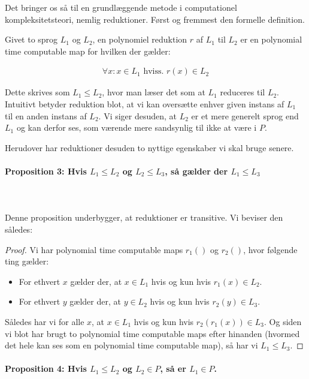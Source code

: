 Det bringer os så til en grundlæggende metode i computationel kompleksitetsteori, nemlig reduktioner. Først og fremmest den formelle definition.

Givet to sprog $L_1$ og $L_2$, en polynomiel reduktion $r$ af $L_1$ til $L_2$ er en polynomial time computable map for hvilken der gælder:

\begin{align*}
 \forall x : x \in L_1 \text{ hviss. } r(x) \in L_2
\end{align*}

Dette skrives som $L_1 \leq L_2$, hvor man læser det som at $L_1$ reduceres til $L_2$. Intuitivt betyder reduktion blot, at vi kan oversætte enhver given instans af $L_1$ til en anden instans af $L_2$. Vi siger desuden, at $L_2$ er et mere generelt sprog end $L_1$ og kan derfor ses, som værende mere sandsynlig til ikke at være i $P$.


Herudover har  reduktioner desuden to nyttige egenskaber vi skal bruge senere.

\paragraph{Proposition 3: Hvis $L_1 \leq L_2$ og $L_2 \leq L_3$, så gælder der $L_1 \leq L_3$}
~\\
~\\
Denne proposition underbygger, at reduktioner er transitive. Vi beviser den således:

\begin{proof}
 Vi har polynomial time computable maps $r_1()$ og $r_2()$, hvor følgende ting gælder:

\begin{itemize}
 \item For ethvert $x$ gælder der, at $x \in L_1$ hvis og kun hvis $r_1(x) \in L_2$.
 \item For ethvert $y$ gælder der, at $y \in L_2$ hvis og kun hvis $r_2(y) \in L_3$.
\end{itemize}

Således har vi for alle $x$, at $x \in L_1$ hvis og kun hvis $r_2(r_1(x)) \in L_3$. Og siden vi blot har brugt to polynomial time computable maps efter hinanden (hvormed det hele kan ses som en polynomial time computable map), så har vi $L_1 \leq L_3$.
\end{proof}

\paragraph{Proposition 4: Hvis $L_1 \leq L_2$ og $L_2 \in P$, så er $L_1 \in P$.}

